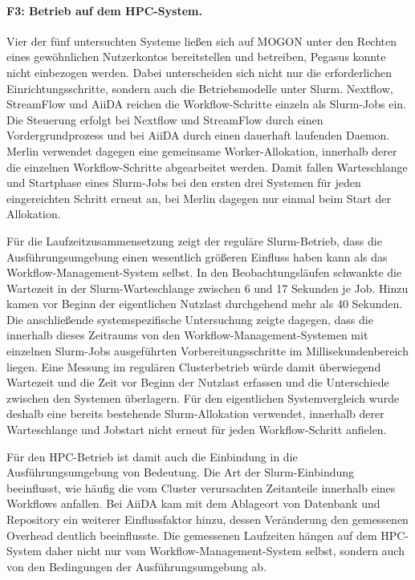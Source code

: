 \paragraph{F3: Betrieb auf dem HPC-System.}
Vier der fünf untersuchten Systeme ließen sich auf MOGON unter den
Rechten eines gewöhnlichen Nutzerkontos bereitstellen und
betreiben, Pegasus konnte nicht einbezogen werden. Dabei
unterscheiden sich nicht nur die erforderlichen
Einrichtungsschritte, sondern auch die Betriebsmodelle unter Slurm.
Nextflow, StreamFlow und AiiDA reichen die Workflow-Schritte
einzeln als Slurm-Jobs ein. Die Steuerung erfolgt bei Nextflow und
StreamFlow durch einen Vordergrundprozess und bei AiiDA durch einen
dauerhaft laufenden Daemon. Merlin verwendet dagegen eine
gemeinsame Worker-Allokation, innerhalb derer die einzelnen
Workflow-Schritte abgearbeitet werden. Damit fallen Warteschlange
und Startphase eines Slurm-Jobs bei den ersten drei Systemen für
jeden eingereichten Schritt erneut an, bei Merlin dagegen nur
einmal beim Start der Allokation.

Für die Laufzeitzusammensetzung zeigt der reguläre Slurm-Betrieb,
dass die Ausführungsumgebung einen wesentlich größeren Einfluss
haben kann als das Workflow-Management-System selbst. In den
Beobachtungsläufen schwankte die Wartezeit in der
Slurm-Warteschlange zwischen 6 und 17 Sekunden je Job. Hinzu kamen
vor Beginn der eigentlichen Nutzlast durchgehend mehr als
40 Sekunden. Die anschließende systemspezifische Untersuchung
zeigte dagegen, dass die innerhalb dieses Zeitraums von den
Workflow-Management-Systemen mit einzelnen Slurm-Jobs ausgeführten Vorbereitungsschritte
im Millisekundenbereich liegen. Eine Messung im regulären Clusterbetrieb würde damit überwiegend Wartezeit und die Zeit vor Beginn der Nutzlast erfassen und die Unterschiede zwischen den Systemen überlagern. Für den eigentlichen Systemvergleich wurde deshalb eine bereits bestehende Slurm-Allokation verwendet, innerhalb derer
Warteschlange und Jobstart nicht erneut für jeden Workflow-Schritt
anfielen.

Für den HPC-Betrieb ist damit auch die Einbindung in die
Ausführungsumgebung von Bedeutung. Die Art der Slurm-Einbindung beeinflusst, wie häufig die vom Cluster verursachten Zeitanteile innerhalb eines
Workflows anfallen. Bei AiiDA kam mit dem Ablageort von Datenbank
und Repository ein weiterer Einflussfaktor hinzu, dessen
Veränderung den gemessenen Overhead deutlich beeinflusste. Die gemessenen Laufzeiten hängen auf dem HPC-System daher nicht nur
vom Workflow-Management-System selbst, sondern auch von den
Bedingungen der Ausführungsumgebung ab.

